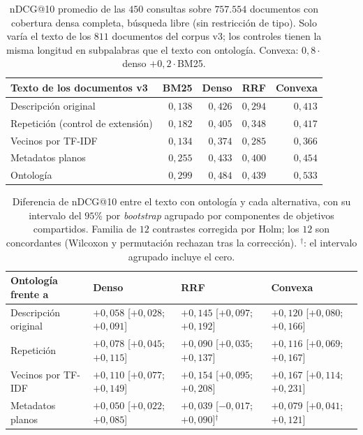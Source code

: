 \documentclass[11pt,letterpaper]{article}
\numberwithin{equation}{section}
\begin{document}
\begin{table}[htbp]
\centering
\footnotesize
\setlength{\tabcolsep}{6pt}
\renewcommand{\arraystretch}{1.15}
\caption{nDCG@10 promedio de las $450$ consultas sobre $757.554$ documentos con cobertura densa completa, búsqueda libre (sin restricción de tipo). Solo varía el texto de los $811$ documentos del corpus v3; los controles tienen la misma longitud en subpalabras que el texto con ontología. Convexa: $0{,}8\cdot$denso $+ 0{,}2\cdot$BM25.}
\label{tab:validacion-brazos}
\begin{tabularx}{\textwidth}{@{}Y r r r r@{}}
\toprule
\textbf{Texto de los documentos v3} & \textbf{BM25} & \textbf{Denso} & \textbf{RRF} & \textbf{Convexa} \\
\midrule
Descripción original & $0{,}138$ & $0{,}426$ & $0{,}294$ & $0{,}413$ \\
Repetición (control de extensión) & $0{,}182$ & $0{,}405$ & $0{,}348$ & $0{,}417$ \\
Vecinos por TF-IDF & $0{,}134$ & $0{,}374$ & $0{,}285$ & $0{,}366$ \\
Metadatos planos & $0{,}255$ & $0{,}433$ & $0{,}400$ & $0{,}454$ \\
Ontología & $0{,}299$ & $0{,}484$ & $0{,}439$ & $0{,}533$ \\
\bottomrule
\end{tabularx}
\end{table}

\begin{table}[htbp]
\centering
\footnotesize
\setlength{\tabcolsep}{5pt}
\renewcommand{\arraystretch}{1.15}
\caption{Diferencia de nDCG@10 entre el texto con ontología y cada alternativa, con su intervalo del $95\%$ por \textit{bootstrap} agrupado por componentes de objetivos compartidos. Familia de $12$ contrastes corregida por Holm; los $12$ son concordantes (Wilcoxon y permutación rechazan tras la corrección). $^{\dagger}$: el intervalo agrupado incluye el cero.}
\label{tab:validacion-controles}
\begin{tabularx}{\textwidth}{@{}Y l l l@{}}
\toprule
\textbf{Ontología frente a} & \textbf{Denso} & \textbf{RRF} & \textbf{Convexa} \\
\midrule
Descripción original & $+0{,}058$ [$+0{,}028$; $+0{,}091$] & $+0{,}145$ [$+0{,}097$; $+0{,}192$] & $+0{,}120$ [$+0{,}080$; $+0{,}166$] \\
Repetición & $+0{,}078$ [$+0{,}045$; $+0{,}115$] & $+0{,}090$ [$+0{,}035$; $+0{,}137$] & $+0{,}116$ [$+0{,}069$; $+0{,}167$] \\
Vecinos por TF-IDF & $+0{,}110$ [$+0{,}077$; $+0{,}149$] & $+0{,}154$ [$+0{,}095$; $+0{,}208$] & $+0{,}167$ [$+0{,}114$; $+0{,}231$] \\
Metadatos planos & $+0{,}050$ [$+0{,}022$; $+0{,}085$] & $+0{,}039$ [$-0{,}017$; $+0{,}090$]$^{\dagger}$ & $+0{,}079$ [$+0{,}041$; $+0{,}121$] \\
\bottomrule
\end{tabularx}
\end{table}
\end{document}
